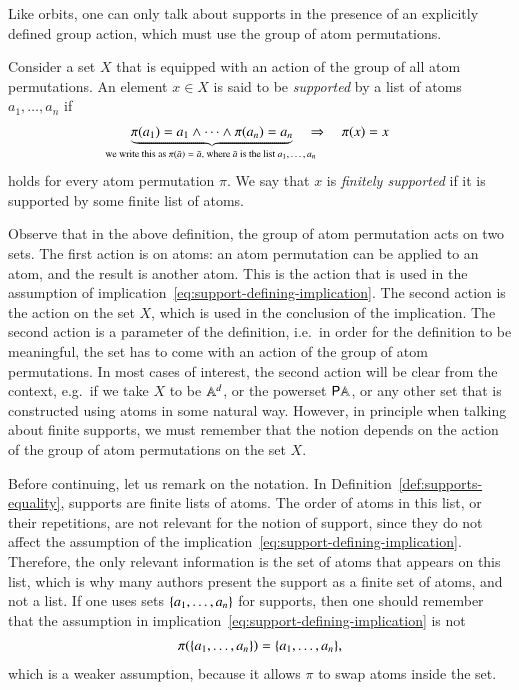 Like orbits, one can only talk about supports in the presence of an explicitly defined group action, which must use the group of atom permutations. 
\begin{definition}[Supports]\label{def:supports-equality}
    Consider a set $X$ that is equipped with an action of the group of all  atom permutations. An element $x \in X$ is said to be \emph{supported} by  a list of  atoms $a_1,\ldots,a_n$ if 
    \begin{align}\label{eq:support-defining-implication}
    \myunderbrace{\pi(a_1)=a_1 \land \cdots \land \pi(a_n)=a_n}{we write this as $\pi(\bar a)= \bar a$, where $\bar a$ is the list $a_1,\ldots,a_n$}  
    \quad \Rightarrow \quad 
    \pi(x) = x
    \end{align}
    holds for every atom permutation $\pi$. We say that $x$ is \emph{finitely supported} if it is supported by some finite list of atoms.
\end{definition}

Observe that in the above definition, the group of atom permutation acts on two sets. The first action is on atoms: an atom permutation can be applied to an atom, and the result is another atom. This is the action that is used in the assumption of implication~\eqref{eq:support-defining-implication}. The second action is the action on the set $X$, which is used in the conclusion of the implication. The second action is a parameter of the definition, i.e.~in order for the definition to be meaningful, the set has to come with an action of the group of atom permutations. In most cases of interest, the second action will be clear from the context, e.g.~if we take $X$ to be $\mathbb A^d$, or the powerset ${\mathsf P} \mathbb A$, or any other set that is constructed using atoms in some natural way. However, in principle when talking about finite supports, we must remember that the notion depends on the action of the group of atom permutations on the set $X$.

Before continuing, let us remark on the notation. In Definition~\ref{def:supports-equality}, supports are finite lists of atoms. The order of atoms in this list, or their repetitions, are not relevant for the notion of support, since they do not affect the assumption of the implication~\eqref{eq:support-defining-implication}. Therefore, the only relevant information is the set of atoms that appears on this list, which is why many authors present the support as a  finite set of atoms, and not a list. If one uses sets $\{a_1,\ldots,a_n\}$ for supports, then one should remember that the assumption in implication~\eqref{eq:support-defining-implication} is not
\begin{align*}
    \pi(\{a_1,\ldots,a_n\}) = \{a_1,\ldots,a_n\},
\end{align*}
which is a weaker assumption, because it allows $\pi$ to swap atoms inside the set.



